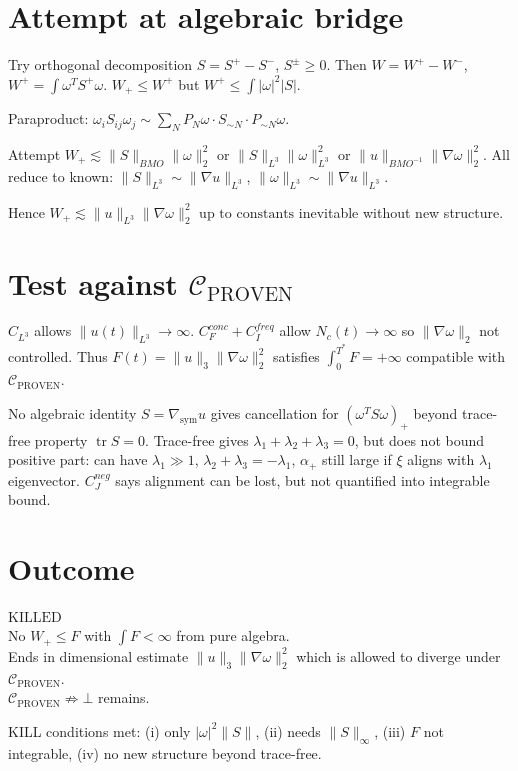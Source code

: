\documentclass[11pt]{article}
\begin{document}
\section{Attempt at algebraic bridge}
Try orthogonal decomposition $S=S^+ - S^-$, $S^\pm\ge0$.
Then $W=W^+-W^-$, $W^+=\int\omega^TS^+\omega$.
$W_+\le W^+$ but $W^+\le\int|\omega|^2|S|$.

Paraproduct: $\omega_iS_{ij}\omega_j\sim\sum_{N}P_N\omega\cdot S_{\sim N}\cdot P_{\sim N}\omega$.

Attempt $W_+\lesssim\|S\|_{BMO}\|\omega\|_2^2$ or $\|S\|_{L^3}\|\omega\|_{L^3}^2$ or $\|u\|_{BMO^{-1}}\|\nabla\omega\|_2^2$.
All reduce to known: $\|S\|_{L^3}\sim\|\nabla u\|_{L^3}$, $\|\omega\|_{L^3}\sim\|\nabla u\|_{L^3}$.

Hence $\boxed{W_+\lesssim\|u\|_{L^3}\|\nabla\omega\|_2^2\text{ up to constants}}$ inevitable without new structure.

\section{Test against $\mathcal C_{\mathrm{PROVEN}}$}
$C_{L^3}$ allows $\|u(t)\|_{L^3}\to\infty$. $C_F^{conc}+C_I^{freq}$ allow $N_c(t)\to\infty$ so $\|\nabla\omega\|_2$ not controlled.
Thus $F(t)=\|u\|_3\|\nabla\omega\|_2^2$ satisfies $\int_0^{T^*}F=+\infty$ compatible with $\mathcal C_{\mathrm{PROVEN}}$.

No algebraic identity $S=\nabla_{\text{sym}}u$ gives cancellation for $(\omega^TS\omega)_+$ beyond trace-free property $\operatorname{tr}S=0$.
Trace-free gives $\lambda_1+\lambda_2+\lambda_3=0$, but does not bound positive part: can have $\lambda_1\gg1$, $\lambda_2+\lambda_3=-\lambda_1$, $\alpha_+$ still large if $\xi$ aligns with $\lambda_1$ eigenvector. $C_J^{neg}$ says alignment can be lost, but not quantified into integrable bound.

\section{Outcome}
\begin{center}
$\boxed{\mathrm{KILLED}}$\\
No $W_+\le F$ with $\int F<\infty$ from pure algebra.\\
Ends in dimensional estimate $\|u\|_3\|\nabla\omega\|_2^2$ which is allowed to diverge under $\mathcal C_{\mathrm{PROVEN}}$.\\
$\mathcal C_{\mathrm{PROVEN}}\not\Rightarrow\bot$ remains.
\end{center}
KILL conditions met: (i) only $|\omega|^2\|S\|$, (ii) needs $\|S\|_\infty$, (iii) $F$ not integrable, (iv) no new structure beyond trace-free.
\end{document}
